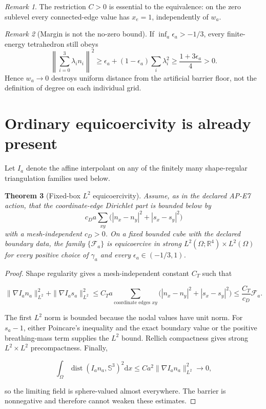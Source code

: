 \documentclass[11pt]{article}
\numberwithin{equation}{section}
\newtheorem{theorem}{Theorem}[section]
\theoremstyle{definition}
\theoremstyle{remark}
\newtheorem{remark}[theorem]{Remark}
\newcommand{\RR}{\mathbb R}
\newcommand{\SSS}{\mathbb S}
\newcommand{\cF}{\mathcal F}
\newcommand{\dd}{\mathrm d}
\begin{document}
\begin{remark}
The restriction $C>0$ is essential to the equivalence: on the zero sublevel
every connected-edge value has $x_e=1$, independently of $w_a$.
\end{remark}

\begin{remark}[Margin is not the no-zero bound]
If $\inf_a\epsilon_a>-1/3$, every finite-energy tetrahedron still obeys
\begin{equation}
 \left\|\sum_{i=0}^3\lambda_i n_i\right\|^2
 \ge\epsilon_a+(1-\epsilon_a)\sum_i\lambda_i^2
 \ge\frac{1+3\epsilon_a}{4}>0.
 \label{eq:no-zero}
\end{equation}
Hence $w_a\to0$ destroys uniform distance from the artificial barrier
floor, not the definition of degree on each individual grid.
\end{remark}

\section{Ordinary equicoercivity is already present}

Let $I_a$ denote the affine interpolant on any of the finitely many
shape-regular triangulation families used below.

\begin{theorem}[Fixed-box $L^2$ equicoercivity]
Assume, as in the declared AP-E7 action, that the coordinate-edge Dirichlet
part is bounded below by
\begin{equation}
 c_Da\sum_{xy}\bigl(|n_x-n_y|^2+|s_x-s_y|^2\bigr)
 \label{eq:base-coercivity}
\end{equation}
with a mesh-independent $c_D>0$.  On a fixed bounded cube with the declared
boundary data, the family
$\{\cF_a\}$ is equicoercive in strong
$L^2(\Omega;\RR^4)\times L^2(\Omega)$ for every positive choice of
$\gamma_a$ and every $\epsilon_a\in(-1/3,1)$.
\end{theorem}

\begin{proof}
Shape regularity gives a mesh-independent constant $C_T$ such that

\begin{equation}
 \|\nabla I_an_a\|_{L^2}^2+
 \|\nabla I_as_a\|_{L^2}^2
 \le C_T a\sum_{\text{coordinate edges }xy}
 \bigl(|n_x-n_y|^2+|s_x-s_y|^2\bigr)
 \le \frac{C_T}{c_D}\cF_a.
 \label{eq:H1-control}
\end{equation}

The first $L^2$ norm is bounded because the nodal values have unit norm.
For $s_a-1$, either Poincare's inequality and the exact boundary value or
the positive breathing-mass term supplies the $L^2$ bound.  Rellich
compactness gives strong $L^2\times L^2$ precompactness.  Finally,

\[
 \int_\Omega\operatorname{dist}(I_an_a,\SSS^3)^2\dd x
 \le C a^2\|\nabla I_an_a\|_{L^2}^2\longrightarrow0,
\]

so the limiting field is sphere-valued almost everywhere.  The barrier is
nonnegative and therefore cannot weaken these estimates.
\end{proof}
\end{document}
